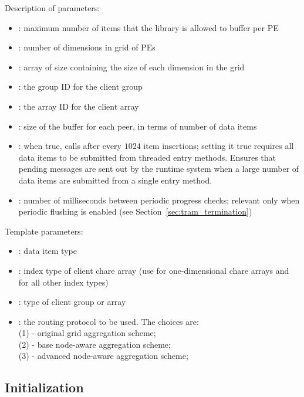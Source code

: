 Description of parameters:
\begin{itemize}
\item {}: maximum number of items that the
  library is allowed to buffer per PE
\item {}: number of dimensions in grid of PEs
\item {}: array of size  containing the
  size of each dimension in the grid
\item {}: the group ID for the client group
\item {}: the array ID for the client array
\item {}: size of the buffer for each peer,
  in terms of number of data items
\item {}: when true, calls  after every $1024$
  item insertions; setting it true requires all data items to be submitted from
  threaded entry methods. Ensures that pending messages are sent out by the
  runtime system when a large number of data items are submitted from a single
  entry method.
\item {}: number of milliseconds between periodic
  progress checks; relevant only when periodic flushing is enabled (see
  Section~\ref{sec:tram_termination})
\end{itemize}

Template parameters:
\begin{itemize}
\item {}: data item type
\item {}: index type of client chare array (use  for
  one-dimensional chare arrays and  for all other index
  types)
\item {}: type of client group or array
\item {}: the routing protocol to be used. The choices are: \\
  (1)  - original grid aggregation scheme; \\
  (2)  - base node-aware aggregation scheme; \\
  (3)  - advanced node-aware aggregation scheme;
\end{itemize}

\subsection{Initialization}

